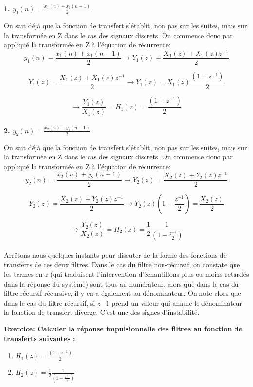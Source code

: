 \documentclass[11pt,a4paper]{article}
\begin{document}
\textbf{1. $y_1(n) = \frac{x_1(n) + x_1(n-1)}{2}$}


On sait déjà que la fonction de transfert s'établit, non pas sur les suites, mais sur la transformée en Z dans le cas des signaux discrets. On commence donc par appliqué la transformée en Z à l'équation de récurrence:\\

\[ y_1(n) = \frac{x_1(n) + x_1(n-1)}{2} \rightarrow Y_1(z) = \frac{X_1(z) + X_1(z)z^{-1}}{2} \]

\[ Y_1(z) = \frac{X_1(z) + X_1(z)z^{-1}}{2} \rightarrow Y_1(z) = X_1(z)\frac{(1 + z^{-1})}{2}  \]

\[  \rightarrow \frac{Y_1(z)}{X_1(z)} = H_1(z) = \frac{(1 + z^{-1})}{2}  \]\\

\textbf{2. $y_2(n) = \frac{x_2(n) + y_2(n-1)}{2}$}


On sait déjà que la fonction de transfert s'établit, non pas sur les suites, mais sur la transformée en Z dans le cas des signaux discrets. On commence donc par appliqué la transformée en Z à l'équation de récurrence:\\

\[ y_2(n) = \frac{x_2(n) + y_2(n-1)}{2} \rightarrow Y_2(z) = \frac{X_2(z) + Y_2(z)z^{-1}}{2} \]

\[ Y_2(z) = \frac{X_2(z) + Y_2(z)z^{-1}}{2} \rightarrow Y_2(z)(1-\frac{z^{-1}}{2}) = \frac{X_2(z)}{2}  \]

\[  \rightarrow \frac{Y_2(z)}{X_2(z)} = H_2(z) = \frac{1}{2}\frac{1}{(1 - \frac{z^{-1}}{2})}  \]\\


Arrêtons nous quelques instants pour discuter de la forme des fonctions de transferts de ces deux filtres. Dans le cas du filtre non-récursif, on constate que les termes en $z$ (qui traduisent l'intervention d'échantillons plus ou moins retardés dans la réponse du système) sont tous au numérateur. alors que dans le cas du filtre récursif récursive, il y en a également au dénominateur. On note alors que dans le cas du filtre récursif, si $z{-1}$ prend un valeur qui annule le dénominateur la fonction de transfert diverge. C'est une des signes d'instabilité. 

\textbf{Exercice: Calculer la réponse impulsionnelle des filtres au fonction de transferts suivantes :}
\begin{enumerate}
\item  $H_1(z) = \frac{(1 + z^{-1})}{2}$
\item  $H_2(z) = \frac{1}{2}\frac{1}{(1 - \frac{z^{-1}}{2})}$
\end{enumerate}
\end{document}
